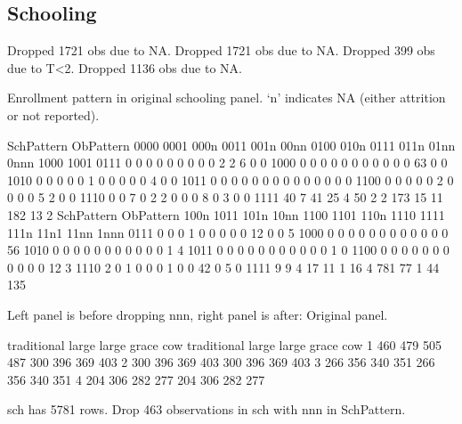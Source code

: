 \subsection{Schooling}



\begin{Schunk}
\begin{Soutput}
Dropped 1721 obs due to NA.
Dropped 1721 obs due to NA.
Dropped 399 obs due to T<2.
Dropped 1136 obs due to NA.
\end{Soutput}
\end{Schunk}
Enrollment pattern in original schooling panel. `n' indicates NA (either attrition or not reported).
\begin{Schunk}
\begin{Soutput}
         SchPattern
ObPattern 0000 0001 000n 0011 001n 00nn 0100 010n 0111 011n 01nn 0nnn 1000 1001
     0111    0    0    0    0    0    0    0    0    0    2    2    6    0    0
     1000    0    0    0    0    0    0    0    0    0    0    0   63    0    0
     1010    0    0    0    0    0    1    0    0    0    0    0    4    0    0
     1011    0    0    0    0    0    0    0    0    0    0    0    0    0    0
     1100    0    0    0    0    0    2    0    0    0    0    5    2    0    0
     1110    0    0    7    0    2    2    0    0    0    8    0    3    0    0
     1111   40    7   41   25    4   50    2    2  173   15   11  182   13    2
         SchPattern
ObPattern 100n 1011 101n 10nn 1100 1101 110n 1110 1111 111n 11n1 11nn 1nnn
     0111    0    0    0    1    0    0    0    0    0   12    0    0    5
     1000    0    0    0    0    0    0    0    0    0    0    0    0   56
     1010    0    0    0    0    0    0    0    0    0    0    0    1    4
     1011    0    0    0    0    0    0    0    0    0    0    0    1    0
     1100    0    0    0    0    0    0    0    0    0    0    0   12    3
     1110    2    0    1    0    0    0    1    0    0   42    0    5    0
     1111    9    9    4   17   11    1   16    4  781   77    1   44  135
\end{Soutput}
\end{Schunk}
Left panel is before dropping \textsf{nnn}, right panel is after: Original panel.
\begin{Schunk}
\begin{Soutput}
  traditional large large grace cow traditional large large grace cow
1         460   479         505 487         300   396         369 403
2         300   396         369 403         300   396         369 403
3         266   356         340 351         266   356         340 351
4         204   306         282 277         204   306         282 277
\end{Soutput}
\end{Schunk}
\textsf{sch} has 5781 rows. Drop 463 observations in \textsf{sch} with nnn in \textsf{SchPattern}. 


